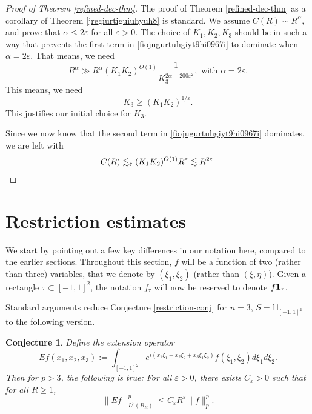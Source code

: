 \documentclass{amsart}%
\numberwithin{equation}{section}
\newtheorem{conjecture}[theorem]{Conjecture}
\newcommand{\e}{\varepsilon}
\newcommand{\ZH}{\mathbb{H}}
\newcommand{\Id}{{\bf{1}}}
\newcommand{\1}{\mathbbm{1}}
\begin{document}
\begin{proof}[Proof of Theorem \ref{refined-dec-thm}]

The proof of Theorem \ref{refined-dec-thm} as a corollary of Theorem \ref{jregiurtiguiuhyuh8}
is standard. 
We assume $C(R)\sim R^\alpha$, and prove that $\alpha\le 2\e$ for all $\e>0$. 
The choice of $K_1,K_2,K_3$ should be in such a way that prevents the first term in \eqref{fiojugurtuhgiyt9hi0967i} to dominate when $\alpha=2\e$. That means, we need 
$$R^{\alpha}\gg R^\alpha (K_1K_2)^{O(1)}\frac1{K_3^{2\alpha-200\e^2}},\text{ with }\alpha=2\e.$$
This means, we need 
\begin{equation}
\label{ejiorjfiougioturgiou}	
K_3\ge (K_1K_2)^{1/\e}.
\end{equation}
This justifies our initial choice for $K_3$. 

Since we now know that the second
term in \eqref{fiojugurtuhgiyt9hi0967i} dominates, we are left with 
\[C(R)\lesssim_\e (K_1K_2)^{O(1)}R^\e\lesssim R^{2\e}. \qedhere\]


\end{proof}
	
\bigskip



\section{Restriction estimates}

We start by pointing out a few key differences in our notation here, compared to the earlier sections. 
Throughout this section, $f$ will be a function of two (rather than three) variables, that we denote by $(\xi_1,\xi_2)$ (rather than $(\xi,\eta)$). Given a rectangle $\tau\subset [-1,1]^2$, the notation $f_\tau$ will now be reserved to denote $f\Id_\tau$.

Standard arguments reduce Conjecture \ref{restriction-conj} for $n=3$, $S=\ZH_{[-1,1]^2}$ to the following version.
\begin{conjecture}
\label{restriction-conj-local}
Define the extension operator
$$
    E f(x_1,x_2,x_3):=\int_{[-1,1]^2}e^{i(x_1\xi_1+x_2\xi_2+x_3\xi_1\xi_2)}f(\xi_1, \xi_2)d\xi_1d\xi_2.
$$
Then for $p>3$, the following is true:
For all $\e>0$, there exists $C_\e>0$ such that for all $R\geq 1$,
\begin{equation}
\label{restriction-esti-local}
    \|Ef\|_{L^p(B_R)}^p\leq C_\e R^\e\|f\|_p^p.
\end{equation}
\end{conjecture}
\end{document}
